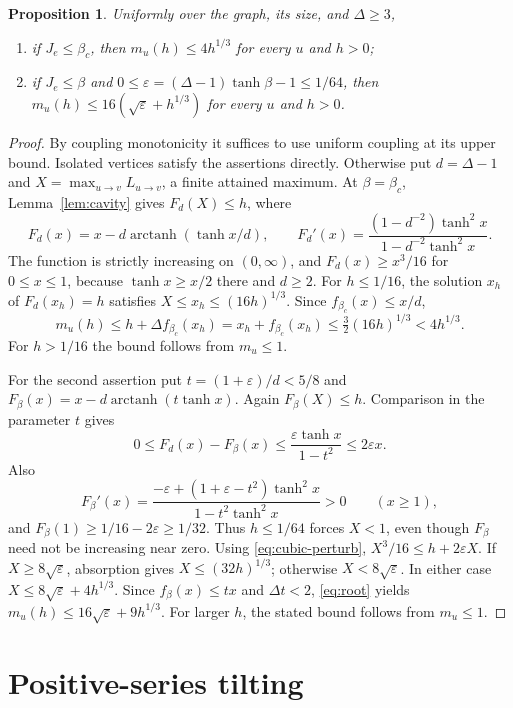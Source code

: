 \documentclass[11pt]{article}
\newtheorem{proposition}[theorem]{Proposition}
\theoremstyle{remark}
\newcommand{\arctanh}{\operatorname{arctanh}}
\begin{document}
\begin{proposition}\label{prop:response}
Uniformly over the graph, its size, and $\Delta\ge3$,
\begin{enumerate}
\item if $J_e\le\beta_c$, then $m_u(h)\le4h^{1/3}$ for every $u$ and $h>0$;
\item if $J_e\le\beta$ and $0\le\varepsilon=(\Delta-1)\tanh\beta-1
 \le1/64$, then
$m_u(h)\le16(\sqrt\varepsilon+h^{1/3})$ for every $u$ and $h>0$.
\end{enumerate}
\end{proposition}
\begin{proof}
By coupling monotonicity it suffices to use uniform coupling at its
upper bound. Isolated vertices satisfy the assertions directly.
Otherwise put $d=\Delta-1$ and
$X=\max_{u\to v}L_{u\to v}$, a finite attained maximum.
At $\beta=\beta_c$, Lemma~\ref{lem:cavity} gives
$F_d(X)\le h$, where
\[
 F_d(x)=x-d\arctanh(\tanh x/d),\qquad
 F_d'(x)=\frac{(1-d^{-2})\tanh^2x}{1-d^{-2}\tanh^2x}.
\]
The function is strictly increasing on $(0,\infty)$, and
$F_d(x)\ge x^3/16$ for $0\le x\le1$, because
$\tanh x\ge x/2$ there and $d\ge2$.
For $h\le1/16$, the solution $x_h$ of $F_d(x_h)=h$
satisfies $X\le x_h\le(16h)^{1/3}$.
Since $f_{\beta_c}(x)\le x/d$,
\[
 m_u(h)\le h+\Delta f_{\beta_c}(x_h)
       =x_h+f_{\beta_c}(x_h)
       \le\tfrac32(16h)^{1/3}<4h^{1/3}.
\]
For $h>1/16$ the bound follows from $m_u\le1$.

For the second assertion put $t=(1+\varepsilon)/d<5/8$ and
$F_\beta(x)=x-d\arctanh(t\tanh x)$. Again $F_\beta(X)\le h$.
Comparison in the parameter $t$ gives
\begin{equation}\label{eq:cubic-perturb}
 0\le F_d(x)-F_\beta(x)
       \le\frac{\varepsilon\tanh x}{1-t^2}\le2\varepsilon x.
\end{equation}
Also
\[
 F_\beta'(x)=
 \frac{-\varepsilon+(1+\varepsilon-t^2)\tanh^2x}
      {1-t^2\tanh^2x}>0\qquad(x\ge1),
\]
and $F_\beta(1)\ge1/16-2\varepsilon\ge1/32$.
Thus $h\le1/64$ forces $X<1$, even though
$F_\beta$ need not be increasing near zero.
Using \eqref{eq:cubic-perturb},
$X^3/16\le h+2\varepsilon X$.
If $X\ge8\sqrt\varepsilon$, absorption gives
$X\le(32h)^{1/3}$; otherwise $X<8\sqrt\varepsilon$.
In either case $X\le8\sqrt\varepsilon+4h^{1/3}$.
Since $f_\beta(x)\le tx$ and $\Delta t<2$, \eqref{eq:root} yields
$m_u(h)\le16\sqrt\varepsilon+9h^{1/3}$.
For larger $h$, the stated bound follows from $m_u\le1$.
\end{proof}

\section{Positive-series tilting}
\end{document}
